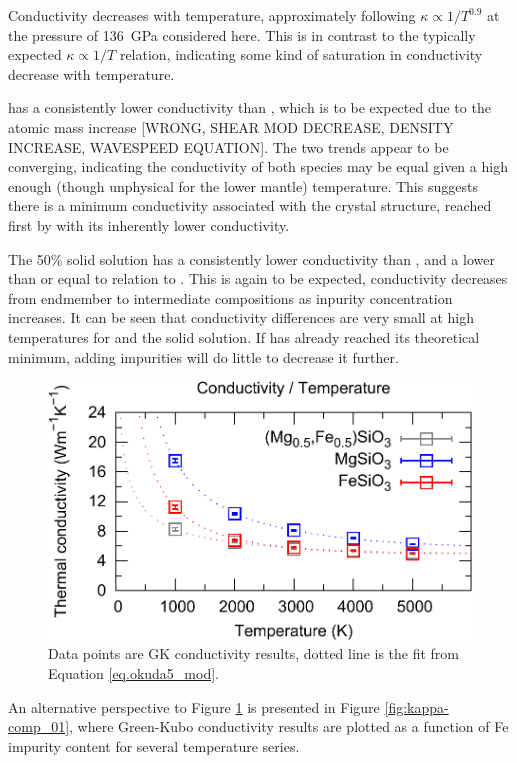 Conductivity decreases with temperature, approximately following $\kappa \propto 1/T^{0.9}$ at the pressure of 136~GPa considered here. This is in contrast to the typically expected $\kappa \propto 1/T$ relation, indicating some kind of saturation in conductivity decrease with temperature.

\fesios has a consistently lower conductivity than \mgsio, which is to be expected due to the atomic mass increase [WRONG, SHEAR MOD DECREASE, DENSITY INCREASE, WAVESPEED EQUATION]. The two trends appear to be converging, indicating the conductivity of both species may be equal given a high enough (though unphysical for the lower mantle) temperature. This suggests there is a minimum conductivity associated with the crystal structure, reached first by \fesios with its inherently lower conductivity.

The 50\% solid solution has a consistently lower conductivity than \mgsio, and a lower than or equal to relation to \fesios. This is again to be expected, conductivity decreases from endmember to intermediate compositions as inpurity concentration increases. It can be seen that conductivity differences are very small at high temperatures for \fesios and the solid solution. If \fesios has already reached its theoretical minimum, adding impurities will do little to decrease it further.

\begin{figure}[h!]
  \includegraphics[width=\linewidth]{Figures/k-t_all_02.png}
  \caption{Data points are GK conductivity results, dotted line is the fit from Equation \ref{eq.okuda5_mod}.}
  \label{fig:kappa-temp_01}
\end{figure}

An alternative perspective to Figure \ref{fig:kappa-temp_01} is presented in Figure \ref{fig:kappa-comp_01}, where Green-Kubo conductivity results are plotted as a function of Fe impurity content for several temperature series.

